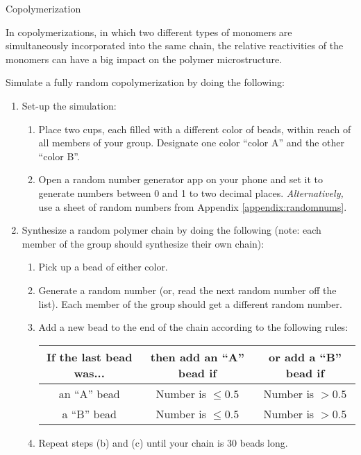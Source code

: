 \begin{activity}{Copolymerization}
\begin{model}
	\label{\labelbase:mdl:simulation}

	In copolymerizations, in which two different types of monomers are simultaneously incorporated into the same chain, the relative reactivities of the monomers can have a big impact on the polymer microstructure.
	
	Simulate a fully random copolymerization by doing the following:
	\begin{enumerate}
		\item Set-up the simulation:
			\begin{enumerate}
				\item Place two cups, each filled with a different color of beads, within reach of all members of your group.  Designate one color ``color A'' and the other ``color B''.
				\item Open a random number generator app on your phone and set it to generate numbers between 0 and 1 to two decimal places.  \emph{Alternatively,} use a sheet of random numbers from Appendix \ref{appendix:randomnums}.
			\end{enumerate}
		\item Synthesize a random polymer chain by doing the following (note: each member of the group should synthesize their own chain):
			\begin{enumerate}
				\item Pick up a bead of either color.
				\item Generate a random number (or, read the next random number off the list).  Each member of the group should get a different random number.
				\item Add a new bead to the end of the chain according to the following rules:
					\begin{center}
					\renewcommand{\arraystretch}{1.5}
					\begin{tabular}{|c|c|c|}
						\hline
						\textbf{If the last bead was...} &  \textbf{then add an ``A'' bead if} & \textbf{or add a ``B'' bead if}\\\hline
						 an ``A'' bead & Number is $\leq 0.5$ & Number is $> 0.5$ \\\hline
						 a ``B'' bead & Number is $\leq 0.5$ & Number is $> 0.5$ \\\hline
					\end{tabular}
					\end{center}
				\item Repeat steps (b) and (c) until your chain is 30 beads long.
			\end{enumerate}
	\end{enumerate}
	

\end{model}
\end{activity}
